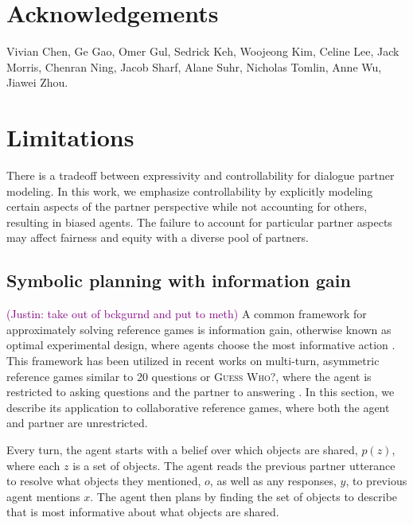\documentclass[11pt]{article}
\newcommand{\justin}[1]{{{\textcolor{purple}{(Justin: #1)}}}}
\newcommand{\daniel}[1]{{{\textcolor{brown}{(Daniel: #1)}}}}
\begin{document}
\section*{Acknowledgements}
Vivian Chen, Ge Gao, Omer Gul, Sedrick Keh, Woojeong Kim, Celine Lee, Jack Morris, Chenran Ning, Jacob Sharf, Alane Suhr, Nicholas Tomlin, Anne Wu, Jiawei Zhou.

\section*{Limitations}
There is a tradeoff between expressivity and  controllability for dialogue partner modeling.
In this work, we emphasize controllability by explicitly modeling certain aspects of the partner perspective while not accounting for others, resulting in biased agents.
The failure to account for
particular partner aspects may affect fairness and equity with a diverse pool of partners.





\appendix

\subsection{Symbolic planning with information gain}
\justin{take out of bckgurnd and put to meth}
A common framework for approximately solving reference games is information gain, otherwise known as optimal experimental design, where agents choose the most informative action \citep{lindley,chaloner,dp}.
This framework has been utilized in recent works on multi-turn, asymmetric reference games similar to 20 questions or \textsc{Guess Who?},
where the agent is restricted to asking questions and the partner to answering \citep{yu2019info,white-etal-2021-open,rao2018q}.
In this section, we describe its application to collaborative reference games, where both the agent and partner are unrestricted.

Every turn, the agent starts with a belief over which objects are shared, $p(z)$, where each $z$ is a set of objects. The agent reads the previous partner utterance to resolve what objects they mentioned, $o$, as well as any responses, $y$, to previous agent mentions $x$.
The agent then plans by finding the set of objects to describe that is most informative about what objects are shared.
\end{document}
